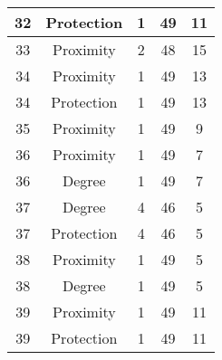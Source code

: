\documentclass[results.tex]{subfiles}
\begin{document}
\begin{center}
\begin{tabular}{| c || c | c | c | c |}
            \hline
            32                      & Protection                   & 1                      & 49                      & 11                   \\
            \hline
            33                      & Proximity                    & 2                      & 48                      & 15                   \\
            \hline
            34                      & Proximity                    & 1                      & 49                      & 13                   \\
            \hline
            34                      & Protection                   & 1                      & 49                      & 13                   \\
            \hline
            35                      & Proximity                    & 1                      & 49                      & 9                    \\
            \hline
            36                      & Proximity                    & 1                      & 49                      & 7                    \\
            \hline
            36                      & Degree                       & 1                      & 49                      & 7                    \\
            \hline
            37                      & Degree                       & 4                      & 46                      & 5                    \\
            \hline
            37                      & Protection                   & 4                      & 46                      & 5                    \\
            \hline
            38                      & Proximity                    & 1                      & 49                      & 5                    \\
            \hline
            38                      & Degree                       & 1                      & 49                      & 5                    \\
            \hline
            39                      & Proximity                    & 1                      & 49                      & 11                   \\
            \hline
            39                      & Protection                   & 1                      & 49                      & 11                   \\

\end{tabular}
\end{center}
\end{document}
